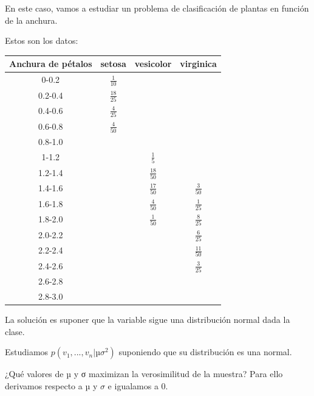 \documentclass{apuntes}
\begin{document}
\begin{example}
En este caso, vamos a estudiar un problema de clasificación de plantas en función de la anchura.

Estos son los datos:

\begin{center}
\label{iris::datos}
\begin{tabular}{|c|c|c|c|}\hline
Anchura de pétalos & setosa & vesicolor & virginica \\[8pt]\hline\hline
0-0.2 & 	$\displaystyle\frac{1}{10}$ & & \\[8pt]\hline
0.2-0.4 & 	$\displaystyle\frac{18}{25}$ & & \\[8pt]\hline
0.4-0.6 & 	$\displaystyle\frac{4}{25}$ & & \\[8pt]\hline
0.6-0.8 & 	$\displaystyle\frac{4}{50}$ & & \\[8pt]\hline
0.8-1.0 & & &\\[8pt]\hline
1-1.2 &  & $\displaystyle\frac{1}{5}$ & \\[8pt]\hline
1.2-1.4 & 				 & $\displaystyle\frac{18}{50}$ & \\[8pt]\hline
1.4-1.6 & 				 & $\displaystyle\frac{17}{50}$ & $\displaystyle\frac{3}{50}$ \\[8pt]\hline
1.6-1.8 & 				 & $\displaystyle\frac{4}{50}$ &  $\displaystyle\frac{1}{25}$\\[8pt]\hline
1.8-2.0 & 				 & $\displaystyle\frac{1}{50}$ & $\displaystyle\frac{8}{25}$\\[8pt]\hline
2.0-2.2 & 				 & & $\displaystyle\frac{6}{25}$\\[8pt]\hline
2.2-2.4 & 				 & & $\displaystyle\frac{11}{50}$\\[8pt]\hline
2.4-2.6 & 				 & & $\displaystyle\frac{3}{25}$\\[8pt]\hline
2.6-2.8 & 				 & & \\[8pt]\hline
2.8-3.0 & 				 & & \\[8pt]\hline
\end{tabular}
\end{center}

La solución es suponer que la variable sigue una distribución normal dada la clase.

\end{example}

Estudiamos $p(v_1,...,v_n | µσ^2)$ suponiendo que su distribución es una normal.

¿Qué valores de $µ$ y σ maximizan la verosimilitud de la muestra? Para ello derivamos respecto a $µ$ y $σ$ e igualamos a 0.
\end{document}
